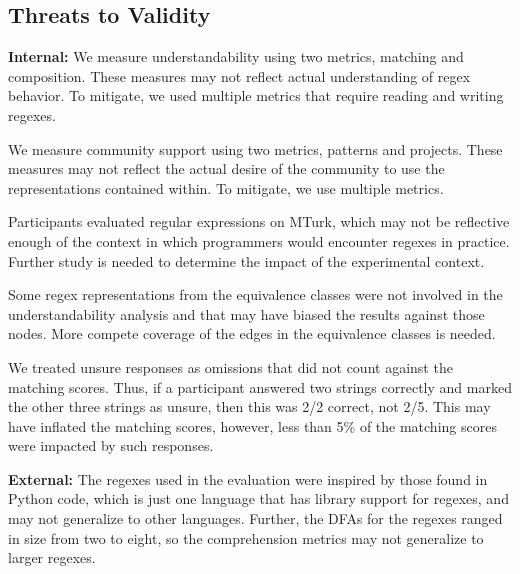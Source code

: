 \subsection{Threats to Validity}

\textbf{Internal:}
We measure understandability  using two metrics, matching and composition. These measures may not reflect actual understanding of regex behavior. To mitigate, we used multiple metrics that require reading and writing regexes. %

We measure community support using two metrics, patterns and projects. These measures may not reflect the actual  desire of the community to use the representations  contained within. To mitigate, we use multiple metrics. 

Participants evaluated regular expressions  on MTurk, which may not be reflective enough of the context in which programmers would encounter regexes in practice. Further study is needed to determine the impact of the experimental context. 

Some regex representations from the equivalence classes were not involved in the understandability analysis and that may have biased the results against those nodes. 
More compete coverage of the edges in the equivalence classes is needed.

We treated unsure responses as omissions that  did not count  against the matching scores. Thus, if a participant answered two strings correctly and marked the other three strings as unsure, then this was 2/2 correct, not 2/5. This may have inflated the matching scores, however, less than 5\% of the matching scores were impacted by such responses.





%

\textbf{External:}
The regexes  used in the evaluation were inspired by those found in Python code, which is just one language that has library support for regexes, and may not generalize to other languages. Further, the DFAs for the regexes ranged in size from two to eight, so the comprehension metrics may not generalize to larger regexes.%

